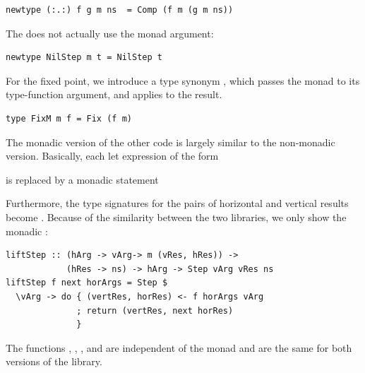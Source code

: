 \documentclass[preprint,natbib]{sigplanconf}
\begin{document}
\begin{small}
\begin{verbatim}
newtype (:.:) f g m ns  = Comp (f m (g m ns))
\end{verbatim}
\end{small}

The  does not actually use the monad argument:

\begin{small}
\begin{verbatim}
newtype NilStep m t = NilStep t
\end{verbatim}
\end{small}

For the fixed point, we introduce a type synonym , which passes the monad to its type-function argument, and applies  to the result.

\begin{small}
\begin{verbatim}
type FixM m f = Fix (f m)
\end{verbatim}
\end{small}

The monadic version of the other code is largely similar to the non-monadic version. Basically, each let expression of the form


is replaced by a monadic statement


Furthermore, the type signatures for the pairs of horizontal and vertical results  become . Because of the similarity between the two libraries, we only show the monadic :

\begin{small}
\begin{verbatim}
liftStep :: (hArg -> vArg-> m (vRes, hRes)) -> 
            (hRes -> ns) -> hArg -> Step vArg vRes ns
liftStep f next horArgs = Step $ 
  \vArg -> do { (vertRes, horRes) <- f horArgs vArg
              ; return (vertRes, next horRes)
              }
\end{verbatim}
\end{small}%

The functions , , , and  are independent of the monad and are the same for both versions of the library.
\end{document}
